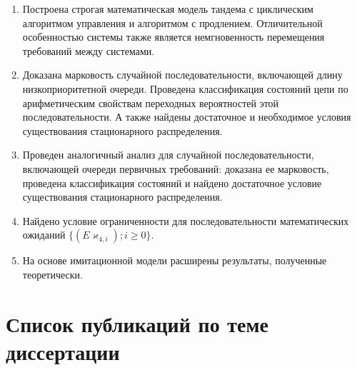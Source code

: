     \begin{enumerate}
        \item Построена строгая математическая модель тандема с циклическим алгоритмом управления и алгоритмом с продлением. Отличительной особенностью системы также является немгновенность перемещения требований между системами. 
        \item Доказана марковость случайной последовательности, включающей длину низкоприоритетной очереди. Проведена классификация состояний цепи по арифметическим свойствам переходных вероятностей этой последовательности. А также найдены достаточное и необходимое условия существования стационарного распределения.
        \item Проведен аналогичный анализ для случайной последовательности, включающей очереди первичных требований: доказана ее марковость, проведена классификация состояний и найдено достаточное условие существования стационарного распределения.
        \item Найдено условие ограниченности для последовательности математических ожиданий $    \{( E\varkappa_{4,i}); i \geqslant 0\}$.
        \item На основе имитационной модели расширены результаты, полученные теоретически.
    \end{enumerate}














\section*{Список публикаций по теме диссертации}

